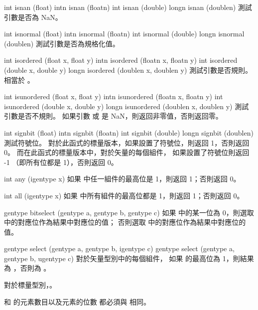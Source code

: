 int isnan (float)
intn isnan (floatn)
int isnan (double)
longn isnan (doublen)
\stopbuffer
{}
測試引數是否為 NaN。
\stopbuffer

int isnormal (float)
intn isnormal (floatn)
int isnormal (double)
longn isnormal (doublen)
\stopbuffer
{}
測試引數是否為規格化值。
\stopbuffer

int isordered (float x, float y)
intn isordered (floatn x, floatn y)
int isordered (double x, double y)
longn isordered (doublen x, doublen y)
\stopbuffer
{}
測試引數是否規則。
相當於 。
\stopbuffer

int isunordered (float x, float y)
intn isunordered (floatn x, floatn y)
int isunordered (double x, double y)
longn isunordered (doublen x, doublen y)
\stopbuffer
{}
測試引數是否不規則。
如果引數  或  是 NaN，則返回非零值，否則返回零。
\stopbuffer

int signbit (float)
intn signbit (floatn)
int signbit (double)
longn signbit (doublen)
\stopbuffer
{}
測試符號位。
對於此函式的標量版本，如果設置了符號位，則返回 1，否則返回 0。
而在此函式的標量版本中，對於矢量的每個組件，
如果設置了符號位則返回 -1 （即所有位都是 1），否則返回 0。
\stopbuffer

int any (igentype x)
\stopbuffer
{}
如果  中任一組件的最高位是 1，則返回 1；否則返回 0。
\stopbuffer

int all (igentype x)
\stopbuffer
{}
如果  中所有組件的最高位都是 1，則返回 1；否則返回 0。
\stopbuffer

gentype bitselect (gentype a,
		gentype b,
		gentype c)
\stopbuffer
{}
如果  中的某一位為 0，則選取  中的對應位作為結果中對應位的值；
否則選取  中的對應位作為結果中對應位的值。
\stopbuffer

gentype select (gentype a,
		gentype b,
		igentype c)
gentype select (gentype a,
		gentype b,
		ugentype c)
\stopbuffer
{}
對於矢量型別中的每個組件，
如果  的最高位為 1，則結果為 ，否則為 。

對於標量型別，。

 和  的元素數目以及元素的位數
都必須與  相同。
\stopbuffer

\startCLFD


\stopCLFD
